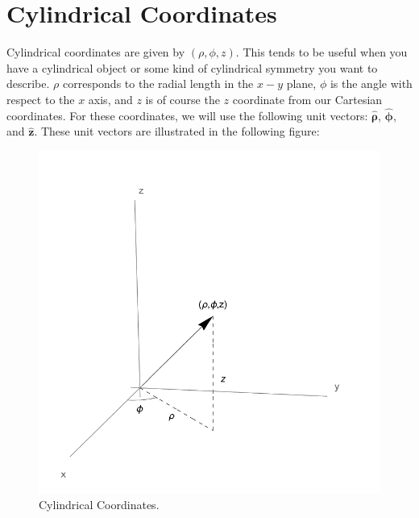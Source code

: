 \documentclass[oneside]{book}
\numberwithin{figure}{section}
\numberwithin{equation}{section}
\newcommand{\bhat}[1]{\bm{\hat{#1}}}
\theoremstyle{definition}
\begin{document}
	\section{Cylindrical Coordinates}
	Cylindrical coordinates are given by $ (\rho,\phi,z) $. This tends to be useful when you have a cylindrical object or some kind of cylindrical symmetry you want to describe. $ \rho $ corresponds to the radial length in the $ x-y $ plane, $ \phi $ is the angle with respect to the $ x $ axis, and $ z $ is of course the $ z $ coordinate from our Cartesian coordinates. For these coordinates, we will use the following unit vectors: $ \bhat{\rho} $, $ \bhat{\phi} $, and $ \bhat{z} $. These unit vectors are illustrated in the following figure:
	\begin{figure}[H]
		\centering
		\includegraphics[width=0.6\columnwidth]{Figures/Coordinates/Cylindrical Coordinates.pdf}
		\caption{Cylindrical Coordinates.}
		\label{fig:cylind}
	\end{figure}
\end{document}
